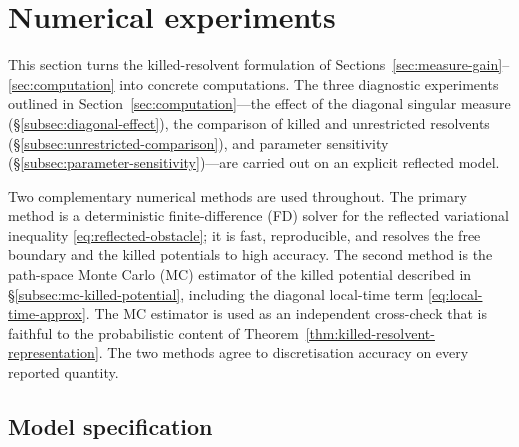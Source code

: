 \documentclass[pdflatex,sn-mathphys-num]{sn-jnl}
\theoremstyle{plain}
\theoremstyle{definition}
\theoremstyle{remark}
\numberwithin{equation}{section}
\begin{document}
\section{Numerical experiments}
\label{sec:numerics}

This section turns the killed-resolvent formulation of
Sections~\ref{sec:measure-gain}--\ref{sec:computation} into concrete
computations. The three diagnostic experiments outlined in
Section~\ref{sec:computation}---the effect of the diagonal singular measure
(\S\ref{subsec:diagonal-effect}), the comparison of killed and unrestricted
resolvents (\S\ref{subsec:unrestricted-comparison}), and parameter
sensitivity (\S\ref{subsec:parameter-sensitivity})---are carried out on an
explicit reflected model.

Two complementary numerical methods are used throughout. The primary method is
a deterministic finite-difference (FD) solver for the reflected variational
inequality \eqref{eq:reflected-obstacle}; it is fast, reproducible, and resolves
the free boundary and the killed potentials to high accuracy. The second method
is the path-space Monte Carlo (MC) estimator of the killed potential described in
\S\ref{subsec:mc-killed-potential}, including the diagonal local-time term
\eqref{eq:local-time-approx}. The MC estimator is used as an independent
cross-check that is faithful to the probabilistic content of
Theorem~\ref{thm:killed-resolvent-representation}. The two methods agree to
discretisation accuracy on every reported quantity.

\subsection{Model specification}
\label{subsec:numerics-model}
\end{document}
